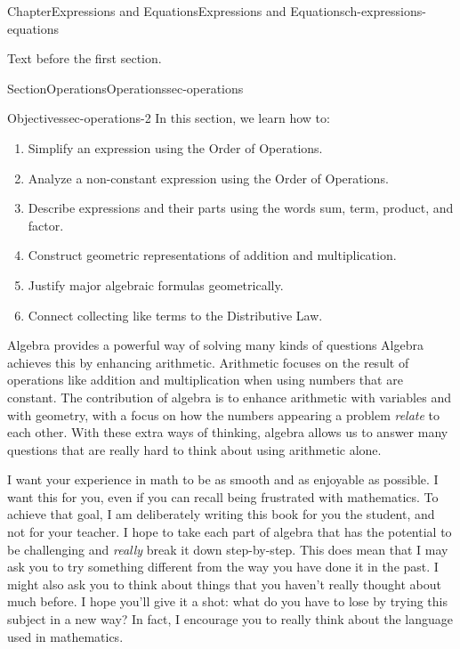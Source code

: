 \documentclass[twoside,11pt,]{book}
\numberwithin{equation}{chapter}
\begin{document}
\begin{chapterptx}{Chapter}{Expressions and Equations}{}{Expressions and Equations}{}{}{ch-expressions-equations}
\renewcommand*{\chaptername}{Chapter}
\begin{introduction}{}%
Text before the first section.%
\end{introduction}%
%
%
\typeout{************************************************}
\typeout{************************************************}
%
\begin{sectionptx}{Section}{Operations}{}{Operations}{}{}{sec-operations}
\begin{objectives}{Objectives}{sec-operations-2}
In this section, we learn how to:%
%
\begin{enumerate}
\item{}Simplify an expression using the Order of Operations.%
\item{}Analyze a non-constant expression using the Order of Operations.%
\item{}Describe expressions and their parts using the words sum, term, product, and factor.%
\item{}Construct geometric representations of addition and multiplication.%
\item{}Justify major algebraic formulas geometrically.%
\item{}Connect collecting like terms to the Distributive Law.%
\end{enumerate}
\end{objectives}
Algebra provides a powerful way of solving many kinds of questions Algebra achieves this by enhancing arithmetic. Arithmetic focuses on the result of operations like addition and multiplication when using numbers that are constant. The contribution of algebra is to enhance arithmetic with variables and with geometry, with a focus on how the numbers appearing a problem \emph{relate} to each other. With these extra ways of thinking, algebra allows us to answer many questions that are really hard to think about using arithmetic alone.%
\par
I want your experience in math to be as smooth and as enjoyable as possible. I want this for you, even if you can recall being frustrated with mathematics. To achieve that goal, I am deliberately writing this book for you the student, and not for your teacher. I hope to take each part of algebra that has the potential to be challenging and \emph{really} break it down step-by-step. This does mean that I may ask you to try something different from the way you have done it in the past. I might also ask you to think about things that you haven't really thought about much before. I hope you'll give it a shot: what do you have to lose by trying this subject in a new way? In fact, I encourage you to really think about the language used in mathematics.%

\end{sectionptx}
\end{chapterptx}
\end{document}
